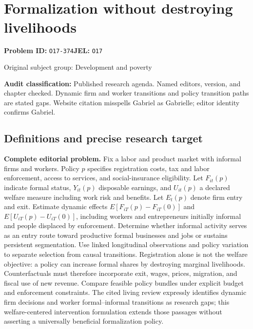 \documentclass[11pt,a4paper]{article}
\begin{document}
\section*{Formalization without destroying livelihoods}
\textbf{Problem ID:} \texttt{O17-374}\quad \textbf{JEL:} \texttt{O17}\par
\label{problem:OP-0376}
{\sffamily\small\color{muted}Original subject group: Development and poverty\par}
\label{definitions:problem:30007658}
\textbf{Audit classification:} Published research agenda. Named editors, version, and chapter checked. Dynamic firm and worker transitions and policy transition paths are stated gaps. Website citation misspells Gabriel as Gabrielle; editor identity confirms Gabriel.
\subsection*{Definitions and precise research target}
\textbf{Complete editorial problem.} Fix a labor and product market with informal firms and workers. Policy \(p\) specifies registration costs, tax and labor enforcement, access to services, and social-insurance eligibility. Let \(F_{it}(p)\) indicate formal status, \(Y_{it}(p)\) disposable earnings, and \(U_{it}(p)\) a declared welfare measure including work risk and benefits. Let \(E_t(p)\) denote firm entry and exit. Estimate dynamic effects \(E[F_{iT}(p)-F_{iT}(0)]\) and \(E[U_{iT}(p)-U_{iT}(0)]\), including workers and entrepreneurs initially informal and people displaced by enforcement. Determine whether informal activity serves as an entry route toward productive formal businesses and jobs or sustains persistent segmentation. Use linked longitudinal observations and policy variation to separate selection from causal transitions. Registration alone is not the welfare objective: a policy can increase formal shares by destroying marginal livelihoods. Counterfactuals must therefore incorporate exit, wages, prices, migration, and fiscal use of new revenue. Compare feasible policy bundles under explicit budget and enforcement constraints. The cited living review expressly identifies dynamic firm decisions and worker formal--informal transitions as research gaps; this welfare-centered intervention formulation extends those passages without asserting a universally beneficial formalization policy.
\end{document}
